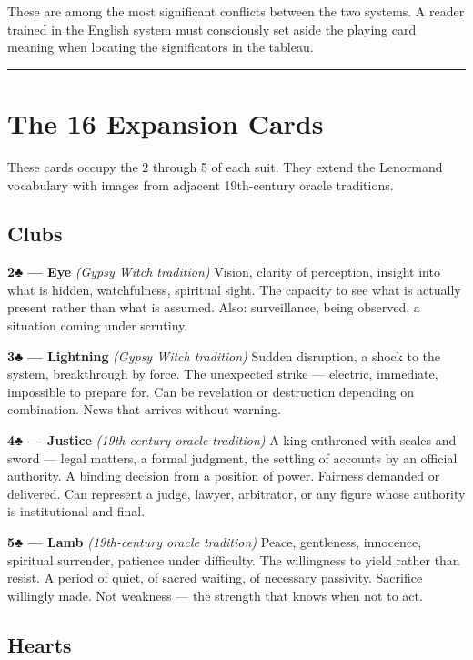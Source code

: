 These are among the most significant conflicts between the two systems. A reader trained in the English system must consciously set aside the playing card meaning when locating the significators in the tableau.

\begin{center}\rule{0.5\linewidth}{0.5pt}\end{center}

\section{The 16 Expansion Cards}\label{the-16-expansion-cards}

These cards occupy the 2 through 5 of each suit. They extend the Lenormand vocabulary with images from adjacent 19th-century oracle traditions.

\subsection{Clubs}\label{clubs}

\textbf{2♣ --- Eye} \emph{(Gypsy Witch tradition)} Vision, clarity of perception, insight into what is hidden, watchfulness, spiritual sight. The capacity to see what is actually present rather than what is assumed. Also: surveillance, being observed, a situation coming under scrutiny.

\textbf{3♣ --- Lightning} \emph{(Gypsy Witch tradition)} Sudden disruption, a shock to the system, breakthrough by force. The unexpected strike --- electric, immediate, impossible to prepare for. Can be revelation or destruction depending on combination. News that arrives without warning.

\textbf{4♣ --- Justice} \emph{(19th-century oracle tradition)} A king enthroned with scales and sword --- legal matters, a formal judgment, the settling of accounts by an official authority. A binding decision from a position of power. Fairness demanded or delivered. Can represent a judge, lawyer, arbitrator, or any figure whose authority is institutional and final.

\textbf{5♣ --- Lamb} \emph{(19th-century oracle tradition)} Peace, gentleness, innocence, spiritual surrender, patience under difficulty. The willingness to yield rather than resist. A period of quiet, of sacred waiting, of necessary passivity. Sacrifice willingly made. Not weakness --- the strength that knows when not to act.

\subsection{Hearts}\label{hearts}

